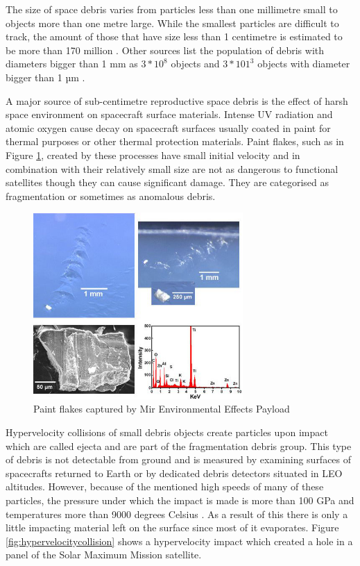	The size of space debris varies from particles less than one millimetre small to objects more than one metre large. While the smallest particles are difficult to track, the amount of those that have size less than 1 centimetre is estimated to be more than 170 million \citep{esabr336}. Other sources list the population of debris with diameters bigger than 1 mm as $3*10^8$ objects and $3*101^3$ objects with diameter bigger than 1 µm \citep{klinkrad2006space}. 

	A major source of sub-centimetre reproductive space debris is the effect of harsh space environment on spacecraft surface materials. Intense UV radiation and atomic oxygen cause decay on spacecraft surfaces usually coated in paint for thermal purposes or other thermal protection materials. Paint flakes, such as in Figure \ref{fig:paintflakes}, created by these processes have small initial velocity and in combination with their relatively small size are not as dangerous to functional satellites though they can cause significant damage. They are categorised as fragmentation or sometimes as anomalous debris.
	
\begin{figure}[H]
	\centering
  \includegraphics[width=8cm]{images/paintflakes}
  \caption{Paint flakes captured by Mir Environmental Effects Payload}
  \label{fig:paintflakes}
\end{figure}
	
	Hypervelocity collisions of small debris objects create particles upon impact which are called ejecta and are part of the fragmentation debris group. This type of debris is not detectable from ground and is measured by examining surfaces of spacecrafts returned to Earth or by dedicated debris detectors situated in LEO altitudes. However, because of the mentioned high speeds of many of these particles, the pressure under which the impact is made is more than 100 GPa and temperatures more than 9000 degrees Celsius \citep{klinkrad2006space}. As a result of this there is only a little impacting material left on the surface since most of it evaporates. Figure \ref{fig:hypervelocitycollision} shows a hypervelocity impact which created a hole in a panel of the Solar Maximum Mission satellite.
	
